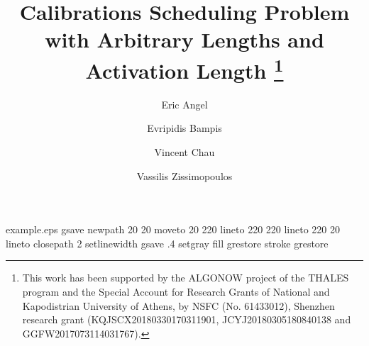 \begin{filecontents*}{example.eps}
gsave
newpath
  20 20 moveto
  20 220 lineto
  220 220 lineto
  220 20 lineto
closepath
2 setlinewidth
gsave
  .4 setgray fill
grestore
stroke
grestore
\end{filecontents*}
\documentclass[twocolumn,natbib]{svjour3}
\smartqed  

\usepackage{amssymb}


\usepackage{amsmath}
\usepackage{float}
\usepackage{color}
\newcommand{\vecteur}[1]{\ensuremath{\mathbf{#1}}}
\newcommand{\precedent}{\texttt{prec}}
\setlength{\unitlength}{0.5cm}
\usepackage{multirow}
\usepackage{amsfonts}
\usepackage{amssymb}
\usepackage{algorithm,algorithmic}
\usepackage{pgfplots}

\newcommand{\todo}[1]{}
\renewcommand{\todo}[1]{{\bf{ \color{red} TODO: {#1}}}}


\newcommand{\nocolor}[1]{{\color{black} #1}}


\emergencystretch=2cm   

\overfullrule=0.1cm














\title{Calibrations Scheduling Problem with Arbitrary Lengths and Activation Length
\thanks{This work has been supported by the ALGONOW project of the THALES program and the Special Account for Research Grants of National and Kapodistrian
University of Athens,
by NSFC (No. 61433012), Shenzhen research grant (KQJSCX20180330170311901, JCYJ20180305180840138 and GGFW2017073114031767).
}}









\author{Eric Angel			\and
        Evripidis Bampis		\and
        Vincent Chau			\and
        Vassilis Zissimopoulos }




